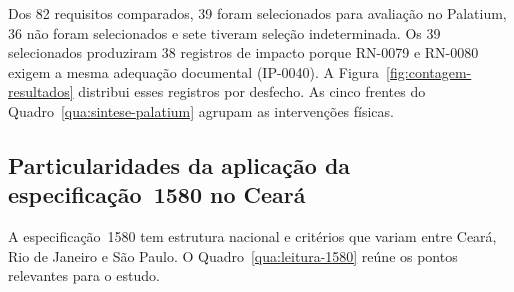 Dos 82 requisitos comparados, 39 foram selecionados para avaliação no Palatium, 36 não foram selecionados e sete tiveram seleção indeterminada. Os 39 selecionados produziram 38 registros de impacto porque RN-0079 e RN-0080 exigem a mesma adequação documental (IP-0040). A Figura~\ref{fig:contagem-resultados} distribui esses registros por desfecho. As cinco frentes do Quadro~\ref{qua:sintese-palatium} agrupam as intervenções físicas.

\par\noindent
\begin{minipage}{\linewidth}
  \label{fig:contagem-resultados}
  \vspace{0.4\baselineskip}
  \centering
  
\end{minipage}
\par

\subsection{Particularidades da aplicação da especificação~1580 no Ceará}\label{sec:critica-1580}

A especificação~1580 tem estrutura nacional e critérios que variam entre Ceará, Rio de Janeiro e São Paulo. O Quadro~\ref{qua:leitura-1580} reúne os pontos relevantes para o estudo.

